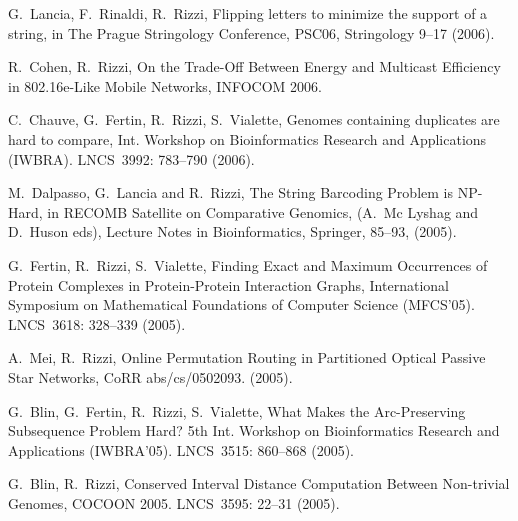 \begin{etaremune}
\vspace{-1.8mm}
  \item {G.~Lancia, F.~Rinaldi, R.~Rizzi},
   \newblock Flipping letters to minimize the support of a string,
   \newblock in The Prague Stringology Conference, PSC06,
   \newblock Stringology 9--17 (2006).

\vspace{-1.8mm}
  \item {\sc R.~Cohen, R.~Rizzi},
   \newblock   On the Trade-Off Between Energy and Multicast Efficiency in 802.16e-Like Mobile Networks,
   \newblock INFOCOM 2006.

\vspace{-1.8mm}
  \item {C.~Chauve, G.~Fertin, R.~Rizzi, S.~Vialette},
   \newblock Genomes containing duplicates are hard to compare,
   \newblock Int. Workshop on Bioinformatics Research and Applications (IWBRA).
   \newblock LNCS~3992: 783--790 (2006).

\vspace{-1.8mm}
  \item {M.~Dalpasso, G.~Lancia and R.~Rizzi},
   \newblock The String Barcoding Problem is NP-Hard,
   \newblock in RECOMB Satellite on Comparative Genomics, (A.~Mc Lyshag and D.~Huson eds),
   \newblock Lecture Notes in Bioinformatics, Springer, 85--93, (2005). 

\vspace{-1.8mm}
  \item {G.~Fertin, R.~Rizzi, S.~Vialette},
   \newblock Finding Exact and Maximum Occurrences
of Protein Complexes in Protein-Protein Interaction Graphs,
   \newblock International Symposium on Mathematical Foundations of Computer Science (MFCS'05).
   \newblock LNCS~3618: 328--339 (2005).

\vspace{-1.8mm}
  \item {A.~Mei, R.~Rizzi},
   \newblock Online Permutation Routing in Partitioned Optical Passive Star Networks,
   \newblock CoRR abs/cs/0502093. (2005).

\vspace{-1.8mm}
  \item {G.~Blin, G.~Fertin, R.~Rizzi, S.~Vialette},
   \newblock What Makes the Arc-Preserving Subsequence Problem Hard?
   \newblock 5th Int. Workshop on Bioinformatics Research and Applications (IWBRA'05).
   \newblock  LNCS~3515: 860--868 (2005).

\vspace{-1.8mm}
  \item {G.~Blin, R.~Rizzi},
   \newblock Conserved Interval Distance Computation Between Non-trivial Genomes,
   \newblock COCOON 2005.
   \newblock  LNCS~3595: 22--31 (2005).


\end{etaremune}
